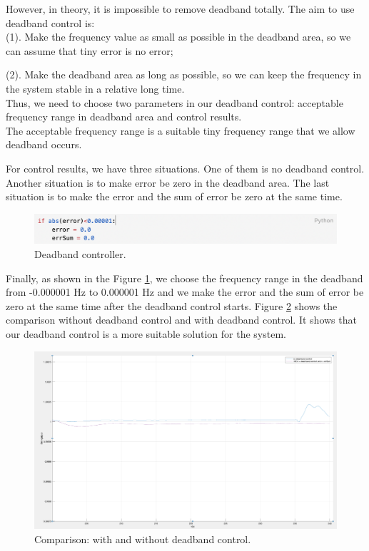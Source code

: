 \documentclass{report}
\begin{document}
However, in theory, it is impossible to remove deadband totally. The aim to use deadband control is:\\
	
    (1). Make the frequency value as small as possible in the deadband area, so we can assume that tiny error is no error;
    
	(2). Make the deadband area as long as possible, so we can keep the frequency in the system stable in a relative long time. \\

Thus, we need to choose two parameters in our deadband control: acceptable frequency range in deadband area and control results.\\

The acceptable frequency range is a suitable tiny frequency range that we allow deadband occurs. 

For control results, we have three situations. One of them is no deadband control. Another situation is to make error be zero in the deadband area. The last situation is to make the error and the sum of error be zero at the same time. \\

\begin{figure}[htbp]
\centering
\includegraphics[width = .999\textwidth]{figure/3_3_deadband_code.png}
\caption{Deadband controller.}
\label{3_3_deadband_code}
\end{figure}

Finally, as shown in the Figure \textcolor{red}{\ref{3_3_deadband_code}}, we choose the frequency range in the deadband from -0.000001 Hz to 0.000001 Hz and we make the error and the sum of error be zero at the same time after the deadband control starts. Figure \textcolor{red}{\ref{3_3_deadband_result}} shows the comparison without deadband control and with deadband control. It shows that our deadband control is a more suitable solution for the system.\\

\begin{figure}[htbp]
\centering
\includegraphics[width = .999\textwidth]{figure/3_3_deadband_result.png}
\caption{Comparison: with and without deadband control.}
\label{3_3_deadband_result}
\end{figure}
\end{document}
